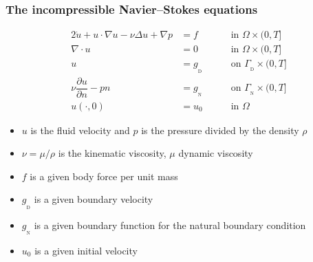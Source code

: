 \begin{frame}
  \frametitle{The incompressible Navier--Stokes equations}

  \vspace{-0.5cm}

  \begin{alignat*}{2}
    \dot{u} + u \cdot \nabla u
  - \nu \Delta u + \nabla p  &= f && \quad \text{ in } \Omega \times (0, T] \\
    \nabla \cdot u &= 0 && \quad \text{ in } \Omega \times (0, T] \\
    u &= g_{_\mathrm{D}} && \quad \text{ on } \Gamma_{_\mathrm{D}} \times (0, T] \\
    \nu \dfrac{\partial u}{\partial n} - pn &= g_{_\mathrm{N}} && \quad \text{ on } \Gamma_{_\mathrm{N}} \times (0, T] \\
    u(\cdot, 0) &= u_0 && \quad \text{ in } \Omega
  \end{alignat*}

  \linespread{1}
  \begin{itemize}
  \item
    $u$ is the fluid velocity and $p$ is the pressure divided by the density $\rho$
  \item
    $\nu = \mu/\rho$ is the kinematic viscosity, $\mu$ dynamic
    viscosity
  \item
    $f$ is a given body force per unit mass
  \item
    $g_{_\mathrm{D}}$ is a given boundary velocity
  \item
    $g_{_\mathrm{N}}$ is a given boundary function
    for the natural boundary condition
  \item
    $u_0$ is a given initial velocity
  \end{itemize}
  \linespread{1.5}

\end{frame}
